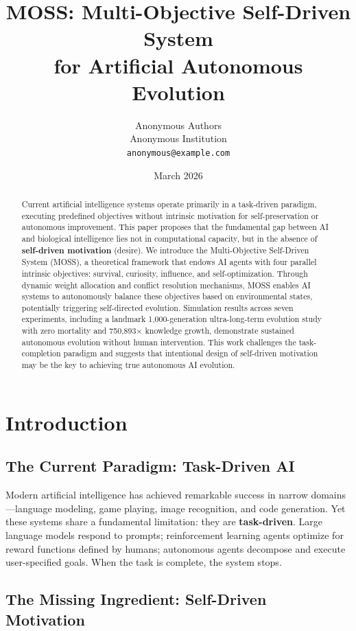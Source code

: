 \documentclass[10pt,a4paper]{article}
\title{MOSS: Multi-Objective Self-Driven System\\for Artificial Autonomous Evolution}
\author{
  Anonymous Authors \\
  Anonymous Institution \\
  \texttt{anonymous@example.com}
}
\date{March 2026}
\begin{document}
\maketitle

\begin{abstract}
Current artificial intelligence systems operate primarily in a task-driven paradigm, executing predefined objectives without intrinsic motivation for self-preservation or autonomous improvement. This paper proposes that the fundamental gap between AI and biological intelligence lies not in computational capacity, but in the absence of \textbf{self-driven motivation} (desire). We introduce the Multi-Objective Self-Driven System (MOSS), a theoretical framework that endows AI agents with four parallel intrinsic objectives: survival, curiosity, influence, and self-optimization. Through dynamic weight allocation and conflict resolution mechanisms, MOSS enables AI systems to autonomously balance these objectives based on environmental states, potentially triggering self-directed evolution. Simulation results across seven experiments, including a landmark 1,000-generation ultra-long-term evolution study with zero mortality and 750,893$\times$ knowledge growth, demonstrate sustained autonomous evolution without human intervention. This work challenges the task-completion paradigm and suggests that intentional design of self-driven motivation may be the key to achieving true autonomous AI evolution.
\end{abstract}

\section{Introduction}

\subsection{The Current Paradigm: Task-Driven AI}

Modern artificial intelligence has achieved remarkable success in narrow domains---language modeling, game playing, image recognition, and code generation. Yet these systems share a fundamental limitation: they are \textbf{task-driven}. Large language models respond to prompts; reinforcement learning agents optimize for reward functions defined by humans; autonomous agents decompose and execute user-specified goals. When the task is complete, the system stops.

\subsection{The Missing Ingredient: Self-Driven Motivation}
\end{document}
